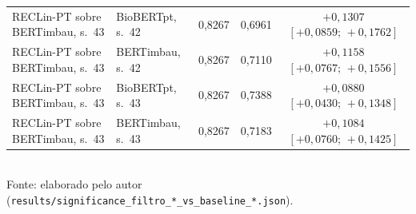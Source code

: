 \begin{table}[htbp]
{\begin{tabular}{llccc}
  \midrule
  RECLin-PT sobre BERTimbau, s.~43 & BioBERTpt, s.~42 & 0,8267 & 0,6961 & $+0,1307$ $[+0,0859;\,+0,1762]$ \\
  RECLin-PT sobre BERTimbau, s.~43 & BERTimbau, s.~42 & 0,8267 & 0,7110 & $+0,1158$ $[+0,0767;\,+0,1556]$ \\
  RECLin-PT sobre BERTimbau, s.~43 & BioBERTpt, s.~43 & 0,8267 & 0,7388 & $+0,0880$ $[+0,0430;\,+0,1348]$ \\
  RECLin-PT sobre BERTimbau, s.~43 & BERTimbau, s.~43 & 0,8267 & 0,7183 & $+0,1084$ $[+0,0760;\,+0,1425]$ \\
  \bottomrule
  \end{tabular}}
  \\[4pt]
  {\footnotesize Fonte: elaborado pelo autor (\texttt{results/significance\_filtro\_*\_vs\_baseline\_*.json}).}
\end{table}
